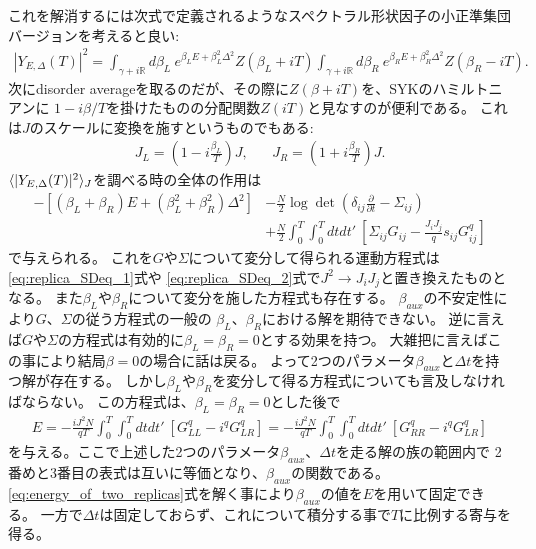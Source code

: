 これを解消するには次式で定義されるようなスペクトラル形状因子の小正準集団バージョンを考えると良い:
\begin{align}
	|Y_{E, \Delta}(T)|^2
	= \int_{\gamma + i\mathbb{R}}d\beta_L\ e^{\beta_LE + \beta_L^2\Delta^2}Z(\beta_L + iT)
	\int_{\gamma + i\mathbb{R}}d\beta_R\ e^{\beta_RE + \beta_R^2\Delta^2}Z(\beta_R - iT).
\end{align}
次にdisorder averageを取るのだが、その際に$Z(\beta + iT)$を、SYKのハミルトニアンに
$1 - i\beta / T$を掛けたものの分配関数$Z(iT)$と見なすのが便利である。
これは$J$のスケールに変換を施すというものでもある:
\begin{align}
	J_L = \left(1 - i\frac{\beta_L}{T}\right)J,\hspace{20pt}
	J_R = \left(1 + i\frac{\beta_R}{T}\right)J.
\end{align}
$\langle |Y_{E,\Delta}(T)|^2 \rangle_J$を調べる時の全体の作用は
\begin{align}
	-\left[(\beta_L + \beta_R)E + (\beta_L^2 + \beta_R^2)\Delta^2\right]
	&-\frac{N}{2}\log\det\left(\delta_{ij}\frac{\partial}{\partial t}
	- \Sigma_{ij}\right)\nonumber\\
	&+\frac{N}{2}\int_0^T\int_0^T dtdt'\ 
		\left[\Sigma_{ij}G_{ij} - \frac{J_iJ_j}{q}s_{ij}G_{ij}^q\right]
\end{align}
で与えられる。
これを$G$や$\Sigma$について変分して得られる運動方程式は\eqref{eq:replica_SDeq_1}式や
\eqref{eq:replica_SDeq_2}式で$J^2\to J_iJ_j$と置き換えたものとなる。
また$\beta_L$や$\beta_R$について変分を施した方程式も存在する。
$\beta_{aux}$の不安定性により$G$、$\Sigma$の従う方程式の一般の
$\beta_L$、$\beta_R$における解を期待できない。
逆に言えば$G$や$\Sigma$の方程式は有効的に$\beta_L = \beta_R = 0$とする効果を持つ。
大雑把に言えばこの事により結局$\beta = 0$の場合に話は戻る。
よって2つのパラメータ$\beta_{aux}$と$\Delta t$を持つ解が存在する。
しかし$\beta_L$や$\beta_R$を変分して得る方程式についても言及しなければならない。
この方程式は、$\beta_L = \beta_R = 0$とした後で
\begin{align}
	E
	= -\frac{iJ^2N}{qT}\int_0^T\int_0^T dtdt'\ [G_{LL}^q - i^qG_{LR}^q]
	= -\frac{iJ^2N}{qT}\int_0^T\int_0^T dtdt'\ [G_{RR}^q - i^qG_{LR}^q]
	\label{eq:energy_of_two_replicas}
\end{align}
を与える。ここで上述した2つのパラメータ$\beta_{aux}$、$\Delta t$を走る解の族の範囲内で
2番めと3番目の表式は互いに等価となり、$\beta_{aux}$の関数である。
\eqref{eq:energy_of_two_replicas}式を解く事により$\beta_{aux}$の値を$E$を用いて固定できる。
一方で$\Delta t$は固定しておらず、これについて積分する事で$T$に比例する寄与を得る。

\pagebreak